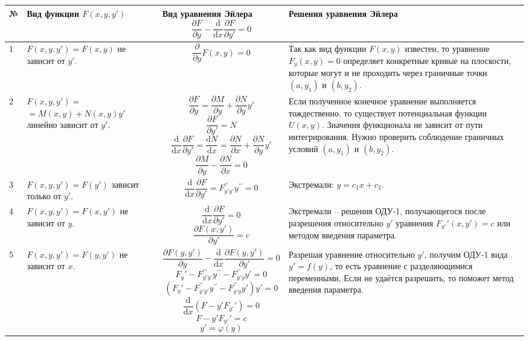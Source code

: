 \documentclass[12pt, a4paper]{article}
\newcommand{\di}{\mathrm{d}}
\begin{document}
\begin{small}
\begin{center}
\begin{tabular}{|p{4mm}|p{4cm}|p{50mm}|p{56mm}|}
\hline
№ & \textbf{Вид функции} \newline $F(x, y, y')$ & \textbf{Вид уравнения Эйлера} \newline \[\frac{\partial F}{\partial y} - \frac{\di}{\di x} \frac{\partial F}{\partial y'} = 0 \] & \textbf{Решения уравнения} \newline \textbf{Эйлера} \\ \hline
1 & $F(x, y, y') = F(x, y)$ \newline не зависит от $y'$. & \[\frac{\partial}{\partial y} F(x, y) = 0 \] & Так как вид функции $F(x, y)$ известен, то уравнение \newline $F_y(x, y) = 0$ определяет конкретные кривые на плоскости, которые могут и не проходить через граничные точки $(a, y_1)$ и $(b, y_2)$. \\ \hline
2 & $F(x, y, y') =$ \newline $= M(x, y) + N(x, y) y'$ \newline линейно зависит от $y'$. & \[\frac{\partial F}{\partial y} = \frac{\partial M}{\partial y} + \frac{\partial N}{\partial y} y' \] \[\frac{\partial F}{\partial y'} = N \] \[\frac{\di}{\di x} \frac{\partial F}{\partial y'} = \frac{\di N}{\di x} = \frac{\partial N}{\partial x} + \frac{\partial N}{\partial y} y' \] \[\frac{\partial M}{\partial y} - \frac{\partial N}{\partial x} = 0 \] & Если полученное конечное уравнение выполняется тождественно, то существует потенциальная функции $U(x, y)$. Значения функционала не зависит от пути интегрирования. Нужно проверить соблюдение граничных условий $(a, y_1)$ и $(b, y_2)$. \\ \hline
3 & $F(x, y, y') = F(y')$ \newline зависит только от $y'$. & \[\frac{\di}{\di x} \frac{\partial F}{\partial y'} = F_{y'y'}^{\prime \prime} y^{\prime \prime} = 0 \] & Экстремали: $y = c_1x + c_2$. \\ \hline
4 & $F(x, y, y') = F(x, y')$ \newline не зависит от $y$. & \[\frac{\di}{\di x} \frac{\partial F}{\partial y'} = 0 \] \[\frac{\partial F(x, y')}{\partial y'} = c \] & Экстремали -- решения ОДУ-1, получающегося после разрешения относительно $y'$ уравнения $F_{y'}'(x, y') = c$ или методом введения параметра. \\ \hline
5 & $F(x, y, y') = F(y, y')$ \newline не зависит от $x$. & \[\frac{\partial F(y, y')}{\partial y} - \frac{\di}{\di x} \frac{\partial F(y, y')}{\partial y'} = 0 \] \[F_y' - F_{y'y'}^{\prime \prime}y^{\prime \prime} - F_{y'y}^{\prime \prime}y' = 0 \] \[(F_y' - F_{y'y'}^{\prime \prime}y^{\prime \prime} - F_{y'y}^{\prime \prime}y')y' = 0 \] \[\frac{\di}{\di x} (F - y'F_{y'}') = 0 \] \[F - y'F_{y'}' = c \] \[y' = \varphi (y) \] & Разрешая уравнение относительно $y'$, получим ОДУ-1 вида $y' = f(y)$, то есть уравнение с разделяющимися переменными. Если не удаётся разрешить, то поможет метод введения параметра. \\ \hline

\end{tabular}
\end{center}
\end{small}
\end{document}
